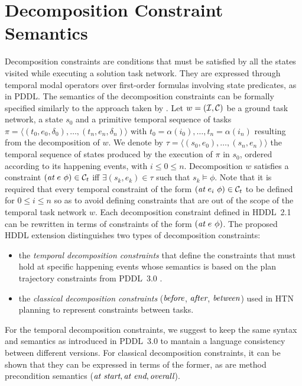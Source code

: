 \documentclass[letterpaper]{article} %
\newcommand{\at}{\text{\it at}}
\newcommand{\before}{\text{\it before}}
\newcommand{\after}{\text{\it after}}
\renewcommand{\between}{\text{\it between}}
\newcommand{\atstart}{\text{\it at start}}
\newcommand{\atend}{\text{\it at end}}
\newcommand{\overall}{\text{\it overall}}
\begin{document}
\section{Decomposition Constraint Semantics}
\label{Sec:Decomposition-Constraints-Semantics}

Decomposition constraints are conditions that must be satisfied by all the states visited while executing a solution task network. They are expressed through temporal modal operators over first-order formulas involving state predicates, as in PDDL. The semantics of the decomposition constraints can be formally specified similarly to the approach taken by \citet{gerevini05}. Let $w = ({\cal{I}}, {\cal{C}})$ be a ground task network, a state $s_0$ and a primitive temporal sequence of tasks $\pi = \langle (t_0, e_0, \delta_0), \ldots, (t_n, e_n, \delta_n) \rangle $ with $t_0 = \alpha(i_0), \ldots, t_n = \alpha(i_n)$ resulting from the decomposition of $w$.
We denote by $\tau = \langle (s_0, e_0), \ldots, (s_n, e_n) \rangle$ the  temporal sequence of states produced by the execution of $\pi$ in $s_0$, ordered according to its happening events, with \mbox{$i \leq 0 \leq n$}. Decomposition $w$ satisfies a constraint $(\at \ e \ \phi) \in {\cal{C}}_t$ iff $\exists (s_k, e_k) \in \tau$ such that $s_k \models \phi$. %
%
Note that it is required that every temporal constraint of the form $(\at \ e_i \ \phi) \in {\cal{C}}_t$ to be defined for $0 \leq i \leq n$ so as to avoid defining constraints that are out of the scope of the temporal task network $w$. Each decomposition constraint defined in HDDL~2.1 can be rewritten in terms of constraints of the form $(\at \ e\ \phi)$. The proposed HDDL extension distinguishes two types of decomposition constraints:
\begin{itemize}
    \item the \emph{temporal decomposition constraints} that define the constraints that must hold at specific happening events whose semantics is based on the plan trajectory constraints from PDDL~3.0 \cite{gerevini05}.
    \item the \emph{classical decomposition constraints} ($\before$, $\after$, $\between$) used in HTN planning \citep{erol94} to represent constraints between tasks.
\end{itemize}

For the temporal decomposition constraints, we suggest to keep the same syntax and semantics as introduced in PDDL~3.0 to mantain a language consistency between different versions.
For classical decomposition constraints, it can be shown that they can be expressed in terms of the former, as are method precondition semantics ($\atstart, \atend, \overall$).
\end{document}

